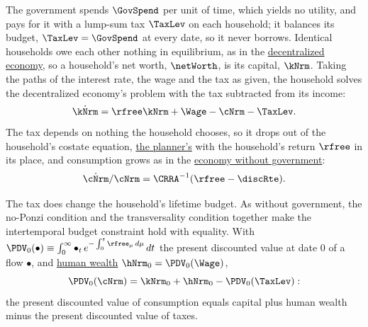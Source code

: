 \documentclass{econark}
\begin{document}
The government spends $\GovSpend$ per unit of time, which yields no utility, and pays for it with a lump-sum tax $\TaxLev$ on each household; it balances its budget, $\TaxLev = \GovSpend$ at every date, so it never borrows. Identical households owe each other nothing in equilibrium, as in the \href{https://intertemporal-choice.github.io/content/growth/decentralizingrck/}{decentralized economy}, so a household's net worth, $\netWorth$, is its capital, $\kNrm$. Taking the paths of the interest rate, the wage and the tax as given, the household solves the decentralized economy's problem with the tax subtracted from its income:
\begin{equation}
  \dot{\kNrm} = \rfree\kNrm + \Wage - \cNrm - \TaxLev . \label{eq:hhbc}
\end{equation}
The tax depends on nothing the household chooses, so it drops out of the household's costate equation, \href{https://intertemporal-choice.github.io/content/appendices/mathematical/hamiltonianvsdiscrete/\#eq-lamgrow}{the planner's} with the household's return $\rfree$ in its place, and consumption grows as in the \href{https://intertemporal-choice.github.io/content/growth/decentralizingrck/\#eq-cdotindiv}{economy without government}:
\begin{equation}
  \dot{\cNrm}/\cNrm = \CRRA^{-1}(\rfree - \discRte) . \label{eq:RCKGov-cdot}
\end{equation}

The tax does change the household's lifetime budget. As without government, the no-Ponzi condition and the transversality condition together make the intertemporal budget constraint hold with equality. With $\PDV_{0}(\bullet) \equiv \int_{0}^{\infty} \bullet_{t}\, e^{-\int_{0}^{t}\rfree_{\mu}\,d\mu}\,dt$ the present discounted value at date 0 of a flow $\bullet$, and \href{https://intertemporal-choice.github.io/content/growth/decentralizingrck/\#eq-humwealth}{human wealth} $\hNrm_{0} = \PDV_{0}(\Wage)$,
\begin{equation}
  \PDV_{0}(\cNrm) = \kNrm_{0} + \hNrm_{0} - \PDV_{0}(\TaxLev) : \label{eq:RCKGov-hhibc}
\end{equation}
the present discounted value of consumption equals capital plus human wealth minus the present discounted value of taxes.
\end{document}
